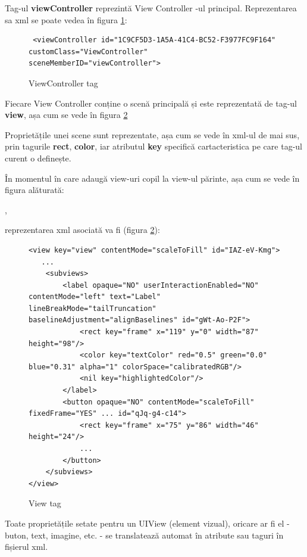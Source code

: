 Tag-ul \textbf{viewController} reprezintă View Controller -ul principal. Reprezentarea sa xml se poate vedea în figura \ref{fig:viewController}:

\begin{figure}[!htbp]
\lstset{language=XML}
\begin{lstlisting}
 <viewController id="1C9CF5D3-1A5A-41C4-BC52-F3977FC9F164" customClass="ViewController" sceneMemberID="viewController">
\end{lstlisting}
\caption{ViewController tag}\label{fig:viewController}
\end{figure}

Fiecare View Controller conține o scenă principală și este reprezentată de tag-ul \textbf{view}, așa cum se vede în figura \ref{fig:view}

Proprietățile unei scene sunt reprezentate, așa cum se vede în xml-ul de mai sus, prin tagurile \textbf{rect}, \textbf{color}, iar atributul \textbf{key} specifică cartacteristica pe care tag-ul curent o definește.

În momentul în care adaugă view-uri copil la view-ul părinte, așa cum se vede în figura alăturată:

 , 


reprezentarea xml asociată va fi (figura \ref{fig:view}):

\begin{figure}[!htbp]
\lstset{language=XML}
\begin{lstlisting}
<view key="view" contentMode="scaleToFill" id="IAZ-eV-Kmg">
   ...
    <subviews>
        <label opaque="NO" userInteractionEnabled="NO" contentMode="left" text="Label" lineBreakMode="tailTruncation" baselineAdjustment="alignBaselines" id="gWt-Ao-P2F">
            <rect key="frame" x="119" y="0" width="87" height="98"/>
            <color key="textColor" red="0.5" green="0.0" blue="0.31" alpha="1" colorSpace="calibratedRGB"/>
            <nil key="highlightedColor"/>
        </label>
        <button opaque="NO" contentMode="scaleToFill" fixedFrame="YES" ... id="qJq-g4-c14">
            <rect key="frame" x="75" y="86" width="46" height="24"/>
            ...
        </button>
    </subviews>
</view>
\end{lstlisting}
\caption{View tag}\label{fig:view}
\end{figure}

Toate proprietățile setate pentru un UIView (element vizual), oricare ar fi el - buton, text, imagine, etc. - se translatează automat în atribute sau taguri în fișierul xml.

